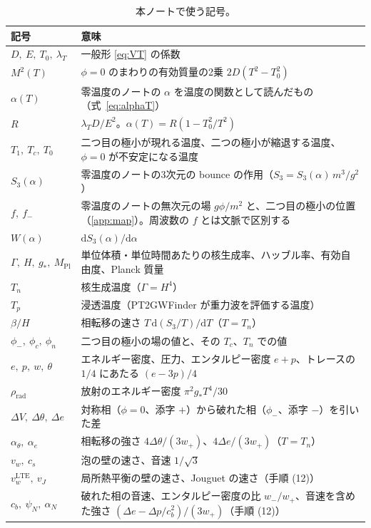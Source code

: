 \documentclass[a4paper,10pt]{ltjsarticle}
\newcommand{\dd}{\mathrm{d}}
\begin{document}
\begin{table}[tbp]
\centering\small
\caption{本ノートで使う記号。}
\label{tab:notation}
\begin{tabularx}{\linewidth}{>{\raggedright\arraybackslash}p{3.6cm}X}
\toprule
\textbf{記号} & \textbf{意味} \\
\midrule
$D,\ E,\ T_0,\ \lambda_T$ & 一般形 \eqref{eq:VT} の係数 \\
$M^2(T)$ & $\phi=0$ のまわりの有効質量の2乗 $2D(T^2-T_0^2)$ \\
$\alpha(T)$ & 零温度のノートの $\alpha$ を温度の関数として読んだもの（式~\eqref{eq:alphaT}） \\
$R$ & $\lambda_TD/E^2$。$\alpha(T)=R(1-T_0^2/T^2)$ \\
$T_1,\ T_c,\ T_0$ & 二つ目の極小が現れる温度、二つの極小が縮退する温度、$\phi=0$ が不安定になる温度 \\
$S_3(\alpha)$ & 零温度のノートの3次元の bounce の作用（$S_3=S_3(\alpha)\,m^3/g^2$） \\
$f,\ f_-$ & 零温度のノートの無次元の場 $g\phi/m^2$ と、二つ目の極小の位置（\ref{app:map}）。周波数の $f$ とは文脈で区別する \\
$W(\alpha)$ & $\dd S_3(\alpha)/\dd\alpha$ \\
$\Gamma,\ H,\ g_*,\ M_{\mathrm{Pl}}$ & 単位体積・単位時間あたりの核生成率、ハッブル率、有効自由度、Planck 質量 \\
$T_n$ & 核生成温度（$\Gamma=H^4$） \\
$T_p$ & 浸透温度（PT2GWFinder が重力波を評価する温度） \\
$\beta/H$ & 相転移の速さ $T\,\dd(S_3/T)/\dd T$（$T=T_n$） \\
$\phi_-,\ \phi_c,\ \phi_n$ & 二つ目の極小の場の値と、その $T_c$、$T_n$ での値 \\
$e,\ p,\ w,\ \theta$ & エネルギー密度、圧力、エンタルピー密度 $e+p$、トレースの $1/4$ にあたる $(e-3p)/4$ \\
$\rho_{\mathrm{rad}}$ & 放射のエネルギー密度 $\pi^2g_*T^4/30$ \\
$\Delta V,\ \Delta\theta,\ \Delta e$ & 対称相（$\phi=0$、添字 $+$）から破れた相（$\phi_-$、添字 $-$）を引いた差 \\
$\alpha_\theta,\ \alpha_e$ & 相転移の強さ $4\Delta\theta/(3w_+)$、$4\Delta e/(3w_+)$（$T=T_n$） \\
$v_w,\ c_s$ & 泡の壁の速さ、音速 $1/\sqrt3$ \\
$v_w^{\mathrm{LTE}},\ v_J$ & 局所熱平衡の壁の速さ、Jouguet の速さ（手順 (12)） \\
$c_b,\ \psi_N,\ \alpha_N$ & 破れた相の音速、エンタルピー密度の比 $w_-/w_+$、音速を含めた強さ $(\Delta e-\Delta p/c_b^2)/(3w_+)$（手順 (12)） \\

\end{tabularx}
\end{table}
\end{document}
